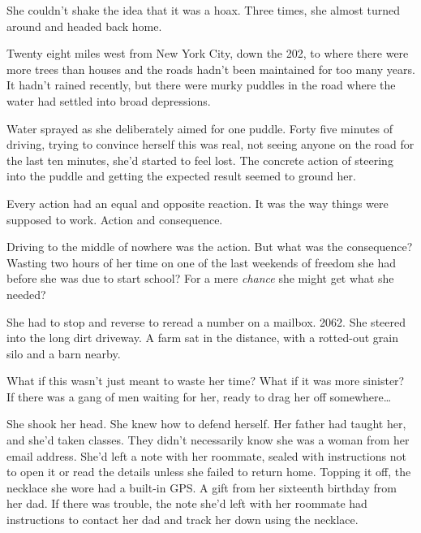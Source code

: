 





She couldn't shake the idea that it was a hoax.  Three times, she almost turned around and headed back home.



Twenty eight miles west from New York City, down the 202, to where there were more trees than houses and the roads hadn't been maintained for too many years.  It hadn't rained recently, but there were murky puddles in the road where the water had settled into broad depressions.



Water sprayed as she deliberately aimed for one puddle.  Forty five minutes of driving, trying to convince herself this was real, not seeing anyone on the road for the last ten minutes, she'd started to feel lost.  The concrete action of steering into the puddle and getting the expected result seemed to ground her.



Every action had an equal and opposite reaction.  It was the way things were supposed to work.  Action and consequence.



Driving to the middle of nowhere was the action.  But what was the consequence?  Wasting two hours of her time on one of the last weekends of freedom she had before she was due to start school?  For a mere \emph{chance} she might get what she needed?



She had to stop and reverse to reread a number on a mailbox.  2062.  She steered into the long dirt driveway.  A farm sat in the distance, with a rotted-out grain silo and a barn nearby.



What if this wasn't just meant to waste her time?  What if it was more sinister?  If there was a gang of men waiting for her, ready to drag her off somewhere\ldots



She shook her head.  She knew how to defend herself.  Her father had taught her, and she'd taken classes.  They didn't necessarily know she was a woman from her email address. She'd left a note with her roommate, sealed with instructions not to open it or read the details unless she failed to return home.  Topping it off, the necklace she wore had a built-in GPS.  A gift from her sixteenth birthday from her dad.  If there was trouble, the note she'd left with her roommate had instructions to contact her dad and track her down using the necklace.



